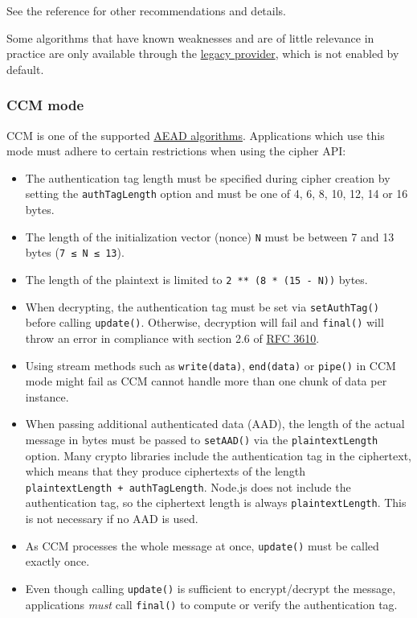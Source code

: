 See the reference for other recommendations and details.

Some algorithms that have known weaknesses and are of little relevance
in practice are only available through the
\href{cli.md\#--openssl-legacy-provider}{legacy provider}, which is not
enabled by default.

\subsubsection{CCM mode}\label{ccm-mode}

CCM is one of the supported
\href{https://en.wikipedia.org/wiki/Authenticated_encryption}{AEAD
algorithms}. Applications which use this mode must adhere to certain
restrictions when using the cipher API:

\begin{itemize}
\tightlist
\item
  The authentication tag length must be specified during cipher creation
  by setting the \texttt{authTagLength} option and must be one of 4, 6,
  8, 10, 12, 14 or 16 bytes.
\item
  The length of the initialization vector (nonce) \texttt{N} must be
  between 7 and 13 bytes (\texttt{7\ ≤\ N\ ≤\ 13}).
\item
  The length of the plaintext is limited to
  \texttt{2\ **\ (8\ *\ (15\ -\ N))} bytes.
\item
  When decrypting, the authentication tag must be set via
  \texttt{setAuthTag()} before calling \texttt{update()}. Otherwise,
  decryption will fail and \texttt{final()} will throw an error in
  compliance with section 2.6 of
  \href{https://www.rfc-editor.org/rfc/rfc3610.txt}{RFC 3610}.
\item
  Using stream methods such as \texttt{write(data)}, \texttt{end(data)}
  or \texttt{pipe()} in CCM mode might fail as CCM cannot handle more
  than one chunk of data per instance.
\item
  When passing additional authenticated data (AAD), the length of the
  actual message in bytes must be passed to \texttt{setAAD()} via the
  \texttt{plaintextLength} option. Many crypto libraries include the
  authentication tag in the ciphertext, which means that they produce
  ciphertexts of the length \texttt{plaintextLength\ +\ authTagLength}.
  Node.js does not include the authentication tag, so the ciphertext
  length is always \texttt{plaintextLength}. This is not necessary if no
  AAD is used.
\item
  As CCM processes the whole message at once, \texttt{update()} must be
  called exactly once.
\item
  Even though calling \texttt{update()} is sufficient to encrypt/decrypt
  the message, applications \emph{must} call \texttt{final()} to compute
  or verify the authentication tag.
\end{itemize}

